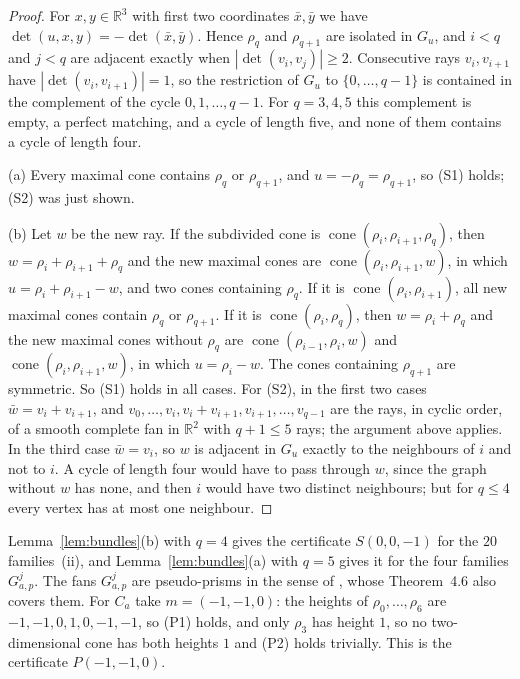 \documentclass[12pt]{article}
\newcommand{\R}{\mathbb{R}}
\newcommand{\cone}{\operatorname{cone}}
\begin{document}
\begin{proof}
For $x,y\in\R^3$ with first two coordinates $\bar x,\bar y$ we have $\det(u,x,y)=-\det(\bar x,\bar y)$. Hence $\rho_q$ and $\rho_{q+1}$ are isolated in $G_u$, and $i<q$ and $j<q$ are adjacent exactly when $|\det(v_i,v_j)|\ge2$. Consecutive rays $v_i,v_{i+1}$ have $|\det(v_i,v_{i+1})|=1$, so the restriction of $G_u$ to $\{0,\dots,q-1\}$ is contained in the complement of the cycle $0,1,\dots,q-1$. For $q=3,4,5$ this complement is empty, a perfect matching, and a cycle of length five, and none of them contains a cycle of length four.

(a) Every maximal cone contains $\rho_q$ or $\rho_{q+1}$, and $u=-\rho_q=\rho_{q+1}$, so (S1) holds; (S2) was just shown.

(b) Let $w$ be the new ray. If the subdivided cone is $\cone(\rho_i,\rho_{i+1},\rho_q)$, then $w=\rho_i+\rho_{i+1}+\rho_q$ and the new maximal cones are $\cone(\rho_i,\rho_{i+1},w)$, in which $u=\rho_i+\rho_{i+1}-w$, and two cones containing $\rho_q$. If it is $\cone(\rho_i,\rho_{i+1})$, all new maximal cones contain $\rho_q$ or $\rho_{q+1}$. If it is $\cone(\rho_i,\rho_q)$, then $w=\rho_i+\rho_q$ and the new maximal cones without $\rho_q$ are $\cone(\rho_{i-1},\rho_i,w)$ and $\cone(\rho_i,\rho_{i+1},w)$, in which $u=\rho_i-w$. The cones containing $\rho_{q+1}$ are symmetric. So (S1) holds in all cases.
For (S2), in the first two cases $\bar w=v_i+v_{i+1}$, and $v_0,\dots,v_i,v_i+v_{i+1},v_{i+1},\dots,v_{q-1}$ are the rays, in cyclic order, of a smooth complete fan in $\R^2$ with $q+1\le5$ rays; the argument above applies. In the third case $\bar w=v_i$, so $w$ is adjacent in $G_u$ exactly to the neighbours of $i$ and not to $i$. A cycle of length four would have to pass through $w$, since the graph without $w$ has none, and then $i$ would have two distinct neighbours; but for $q\le4$ every vertex has at most one neighbour.
\end{proof}

Lemma~\ref{lem:bundles}(b) with $q=4$ gives the certificate $S(0,0,-1)$ for the $20$ families~(ii), and Lemma~\ref{lem:bundles}(a) with $q=5$ gives it for the four families $G^j_{a,p}$. The fans $G^j_{a,p}$ are pseudo-prisms in the sense of \cite{Cur25}, whose Theorem~4.6 also covers them. For $C_a$ take $m=(-1,-1,0)$: the heights of $\rho_0,\dots,\rho_6$ are $-1,-1,0,1,0,-1,-1$, so (P1) holds, and only $\rho_3$ has height $1$, so no two-dimensional cone has both heights $1$ and (P2) holds trivially. This is the certificate $P(-1,-1,0)$.
\end{document}
